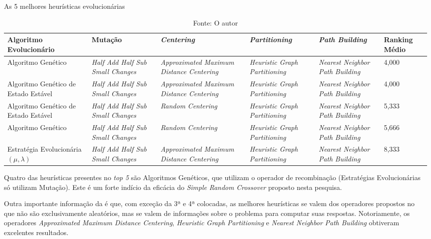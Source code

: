 \begin{table}
	\centering
	\caption{As 5 melhores heurísticas evolucionárias}
	\label{top5}
	\begin{tabularx}{\linewidth}{|X|X|X|X|X|X|}
		\hline
		\textbf{Algoritmo Evolucionário} & \textbf{Mutação} & \textbf{\textit{Centering}} & \textbf{\textit{Partitioning}} & \textbf{\textit{Path Building}} & \textbf{Ranking Médio} \\
		\hline
		Algoritmo Genético & \textit{Half Add Half Sub Small Changes} & \textit{Approximated Maximum Distance Centering} & \textit{Heuristic Graph Partitioning} & \textit{Nearest Neighbor Path Building} &  4,000\\
		\hline
		Algoritmo Genético de Estado Estável & \textit{Half Add Half Sub Small Changes} & \textit{Approximated Maximum Distance Centering} & \textit{Heuristic Graph Partitioning} & \textit{Nearest Neighbor Path Building} & 4,000\\
		\hline
		Algoritmo Genético de Estado Estável & \textit{Half Add Half Sub Small Changes} & \textit{Random Centering} & \textit{Heuristic Graph Partitioning} & \textit{Nearest Neighbor Path Building} & 5,333\\
		\hline
		Algoritmo Genético & \textit{Half Add Half Sub Small Changes} & \textit{Random Centering} & \textit{Heuristic Graph Partitioning} & \textit{Nearest Neighbor Path Building} & 5,666\\
		\hline
		Estratégia Evolucionária $(\mu, \lambda)$ & \textit{Half Add Half Sub Small Changes} & \textit{Approximated Maximum Distance Centering} & \textit{Heuristic Graph Partitioning} & \textit{Nearest Neighbor Path Building} & 8,333\\
		\hline
	\end{tabularx}
	\caption*{Fonte: O autor}
\end{table}

Quatro das heurísticas presentes no \textit{top 5} são Algoritmos Genéticos, que 
utilizam o operador de recombinação (Estratégias Evolucionárias só utilizam 
Mutação). Este é um forte indício da eficácia do 
\textit{Simple Random Crossover} proposto nesta pesquisa.

Outra importante informação da  é que, com exceção da 3ª e 4ª 
colocadas, as melhores heurísticas se valem dos operadores propostos no 
 que não são exclusivamente aleatórios, mas se valem de 
informações sobre o problema para computar suas respostas. Notoriamente, os 
operadores \textit{Approximated Maximum Distance Centering}, 
\textit{Heuristic Graph Partitioning} e \textit{Nearest Neighbor Path Building} 
obtiveram excelentes resultados.

